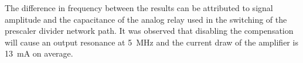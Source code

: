The difference in frequency between the results can be attributed to
signal amplitude and the capacitance of the analog relay used in the switching
of the prescaler divider network path.
It was observed that disabling the compensation will cause an
output resonance at \SI{5}{\mega\hertz} and the current draw of the amplifier
is \SI{13}{\milli\ampere} on average.

